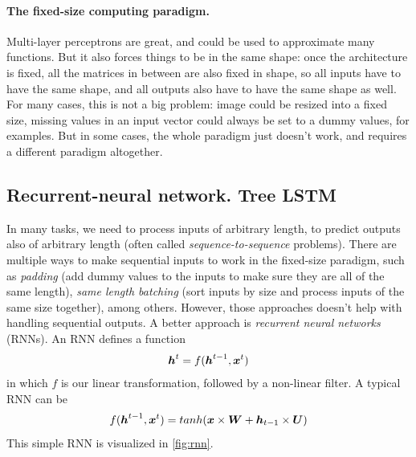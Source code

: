 \paragraph{The fixed-size computing paradigm.} Multi-layer perceptrons are
great, and could be used to approximate many functions. But it also forces
things to be in the same shape: once the architecture is fixed, all the matrices
in between are also fixed in shape, so all inputs have to have the same shape,
and all outputs also have to have the same shape as well. For many cases, this
is not a big problem: image could be resized into a fixed size, missing
values in an input vector could always be set to a dummy values, for examples.
But in some cases, the whole paradigm just doesn't work, and requires a
different paradigm altogether. 


\subsection{Recurrent-neural network. Tree LSTM}
In many tasks, we need to process inputs of arbitrary length, to predict outputs also of arbitrary length (often called \emph{sequence-to-sequence} problems). There are multiple ways to make sequential inputs to work in the fixed-size paradigm, such as \emph{padding} (add dummy values to the inputs to make sure they are all of the same length), \emph{same length batching} (sort inputs by size and process inputs of the same size together), among others. However, those approaches doesn't help with handling sequential outputs. A better approach is \emph{recurrent neural networks} (RNNs). An RNN defines a function
\begin{align}
\boldsymbol{h}^t = f(\boldsymbol{h}^{t-1}, \boldsymbol{x}^{t})
\end{align}
in which $f$ is our linear transformation, followed by a non-linear filter. A
typical RNN can be
\begin{align}
  f(\boldsymbol{h}^{t-1}, \boldsymbol{x}^t) = tanh(\boldsymbol{x} \times \boldsymbol{W} + \boldsymbol{h}_{t-1} \times \boldsymbol{U} )
\end{align}
This simple RNN is visualized in \cref{fig:rnn}.
